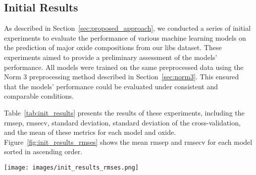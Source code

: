 \subsection{Initial Results}
As described in Section~\ref{sec:proposed_approach}, we conducted a series of initial experiments to evaluate the performance of various machine learning models on the prediction of major oxide compositions from our \gls{libs} dataset.
These experiments aimed to provide a preliminary assessment of the models' performance.
All models were trained on the same preprocessed data using the Norm 3 preprocessing method described in Section~\ref{sec:norm3}.
This ensured that the models' performance could be evaluated under consistent and comparable conditions.

Table~\ref{tab:init_results} presents the results of these experiments, including the \gls{rmsep}, \gls{rmsecv}, standard deviation, standard deviation of the cross-validation, and the mean of these metrics for each model and oxide.
Figure~\ref{fig:init_results_rmses} shows the mean \gls{rmsep} and \gls{rmsecv} for each model sorted in ascending order.

\begin{figure*}[h]
    \centering
    \texttt{[image: images/init\_results\_rmses.png]}
    \caption{Mean \gls{rmsep} and \gls{rmsecv} for each model sorted in ascending order.}
    \label{fig:init_results_rmses}
\end{figure*}

